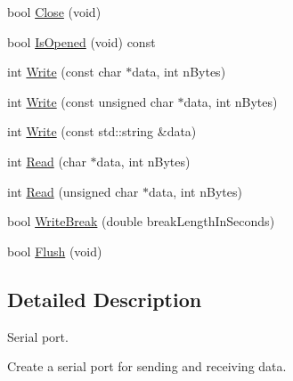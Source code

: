 \begin{DoxyCompactItemize}
\item 
bool \hyperlink{classosa_serial_port_a290aba37a1833f11db1f02f5dab2b83b}{Close} (void)
\item 
bool \hyperlink{classosa_serial_port_a64b3f4b9e6470e795b1d7f323484d449}{Is\-Opened} (void) const 
\item 
int \hyperlink{classosa_serial_port_a7baafbf6d506ca7c3af1532af2e0472d}{Write} (const char $\ast$data, int n\-Bytes)
\item 
int \hyperlink{classosa_serial_port_aaf39457bc6bea83a234488a66d340e6e}{Write} (const unsigned char $\ast$data, int n\-Bytes)
\item 
int \hyperlink{classosa_serial_port_ab40ce98451ba22f5dc4f1d606cf3e510}{Write} (const std\-::string \&data)
\item 
int \hyperlink{classosa_serial_port_ab3fb6c558b3f9cfea6100eb98f8caa19}{Read} (char $\ast$data, int n\-Bytes)
\item 
int \hyperlink{classosa_serial_port_af47e231e6051fcefd0b9a4ccf7709408}{Read} (unsigned char $\ast$data, int n\-Bytes)
\item 
bool \hyperlink{classosa_serial_port_ac9edbc73b59129c5c4600c9d4f414c7c}{Write\-Break} (double break\-Length\-In\-Seconds)
\item 
bool \hyperlink{classosa_serial_port_ae58e9417902641fa50bc5d21af33989e}{Flush} (void)
\end{DoxyCompactItemize}


\subsection{Detailed Description}
Serial port. 

Create a serial port for sending and receiving data. 

